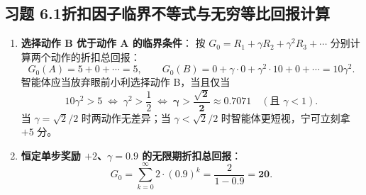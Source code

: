 \subsection*{习题 6.1\quad 折扣因子临界不等式与无穷等比回报计算}
\begin{enumerate}[label=(\arabic*), leftmargin=1.8em]
  \item \textbf{选择动作 B 优于动作 A 的临界条件}：
  按 $G_0 = R_1 + \gamma R_2 + \gamma^2 R_3 + \cdots$ 分别计算两个动作的折扣总回报：
  \[
    G_0(A) = 5 + 0 + \cdots = 5, \qquad
    G_0(B) = 0 + \gamma \cdot 0 + \gamma^2 \cdot 10 + 0 + \cdots = 10\gamma^2.
  \]
  智能体应当放弃眼前小利选择动作 B，当且仅当
  \[
    10\gamma^2 > 5 \;\iff\; \gamma^2 > \frac{1}{2} \;\iff\; \mathbf{\gamma > \frac{\sqrt{2}}{2} \approx 0.7071} \quad (\text{且 } \gamma < 1).
  \]
  当 $\gamma = \sqrt{2}/2$ 时两动作无差异；当 $\gamma < \sqrt{2}/2$ 时智能体更短视，宁可立刻拿 $+5$ 分。
  \item \textbf{恒定单步奖励 $+2$、$\gamma = 0.9$ 的无限期折扣总回报}：
  \[
    G_0 = \sum_{k=0}^{\infty} 2 \cdot (0.9)^k = \frac{2}{1 - 0.9} = \mathbf{20}.
  \]
\end{enumerate}

